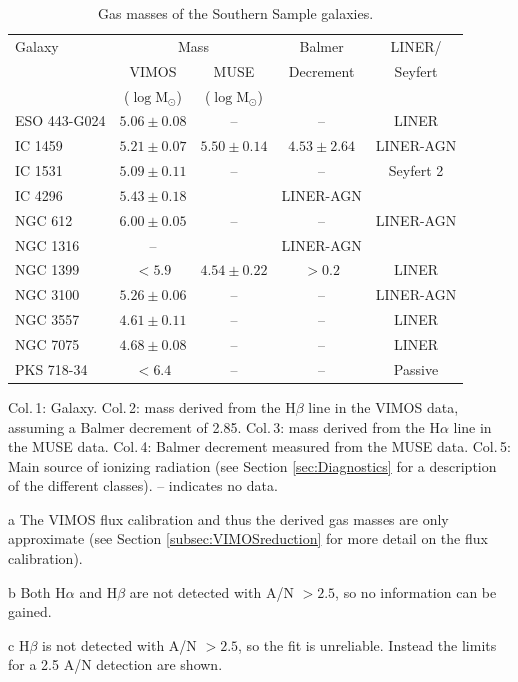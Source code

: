 \begin{table}[t]
	\centering
\begin{threeparttable}
	\caption{Gas masses of the Southern Sample galaxies.}
	\label{tab:gasMass}
	\begin{tabular}{l c c c c}
		\hline
		\hline
		Galaxy & \multicolumn{2}{c}{\ion{H}{ii} Mass} & Balmer & LINER/ \\
		& VIMOS\tnote{a} & MUSE & Decrement & Seyfert \\
		& ($\log\mathrm{M_\odot}$) & ($\log\mathrm{M_\odot}$) & \\
		\hline
		ESO 443-G024 & $5.06 \pm 0.08$ 	& --  		& -- & LINER \\
		IC 1459 	& $5.21 \pm 0.07$	& $5.50 \pm 0.14$ & $4.53 \pm 2.64$ & LINER-AGN\\
		IC 1531 	& $5.09 \pm 0.11$	& -- 		& -- & Seyfert 2\\
		IC 4296		& $5.43 \pm 0.18$	& \tnote{b} & LINER-AGN \\
		NGC 612 	& $6.00 \pm 0.05$ 	& -- 		& -- & LINER-AGN \\
		NGC 1316 	& -- 				& \tnote{b} & LINER-AGN \\
		NGC 1399 	& $< 5.9$\tnote{c}	& $4.54 \pm 0.22$ & $>0.2$\tnote{c} & LINER \\
		NGC 3100 	& $5.26 \pm 0.06$	& -- 		& -- & LINER-AGN \\
		NGC 3557 	& $4.61 \pm 0.11$ 	& -- 		& -- & LINER \\
		NGC 7075 	& $4.68 \pm 0.08$	& -- 		& -- & LINER \\
		PKS 718-34  & $< 6.4$\tnote{c} & -- & -- & Passive \\
		\hline
		\hline
	\end{tabular}
	\begin{tablenotes}
	\footnotesize
	\note Col.\,1: Galaxy. Col.\,2:  mass derived from the H$\beta$ line in the VIMOS data, assuming a Balmer decrement of 2.85. Col.\,3:  mass derived from the H$\alpha$ line in the MUSE data. Col.\,4: Balmer decrement measured from the MUSE data. Col.\,5: Main source of ionizing radiation (see Section \ref{sec:Diagnostics} for a description of the different classes). -- indicates no data.
	\item [a] The VIMOS flux calibration and thus the derived gas masses are only approximate (see Section \ref{subsec:VIMOSreduction} for more detail on the flux calibration).
	\item [b] Both H$\alpha$ and H$\beta$ are not detected with A/N $>2.5$, so no information can be gained.
	\item [c] H$\beta$ is not detected with A/N $> 2.5$, so the fit is unreliable. Instead the limits for a 2.5 A/N detection are shown.
	\end{tablenotes}
\end{threeparttable}
\end{table}

